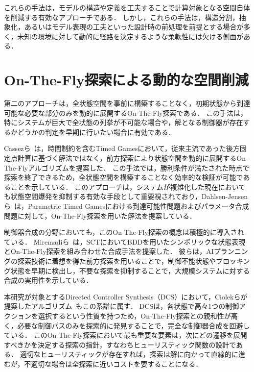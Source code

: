 \documentclass[a4paper,11pt,oneside,openany,report,dvipdfmx]{jsbook}
\begin{document}
これらの手法は，モデルの構造や定義を工夫することで計算対象となる空間自体を削減する有効なアプローチである．
しかし，これらの手法は，構造分割，抽象化，あるいはモデル表現の工夫といった設計時の前処理を前提とする場合が多く，未知の環境に対して動的に経路を決定するような柔軟性には欠ける側面がある．

\section{On-The-Fly探索による動的な空間削減}

第二のアプローチは，全状態空間を事前に構築することなく，初期状態から到達可能な必要な部分のみを動的に展開するOn-The-Fly探索である．
この手法は，特にシステムが巨大で全状態の列挙が不可能な場合や，解となる制御器が存在するかどうかの判定を早期に行いたい場合に有効である．

Cassezら~\cite{OnTheFlyForTimedGames}は，時間制約を含むTimed Gamesにおいて，従来主流であった後方固定点計算に基づく解法ではなく，前方探索により状態空間を動的に展開するOn-The-Flyアルゴリズムを提案した．
この手法では，勝利条件が満たされた時点で探索を終了できるため，全状態空間を構築することなく効率的な検証が可能であることを示している．
このアプローチは，システムが複雑化した現在においても状態空間爆発を抑制する有効な手段として重要視されており，Dahlsen-Jensenら~\cite{OnTheFlyForReachability}は，Parametric Timed Gamesにおける到達可能性問題およびパラメータ合成問題に対して，On-The-Fly探索を用いた解法を提案している．

制御器合成の分野においても，このOn-The-Fly探索の概念は積極的に導入されている．
Miremadiら~\cite{SymbolicOnTheFlySynthesis}は，SCTにおいてBDDを用いたシンボリックな状態表現とOn-The-Fly探索を組み合わせた合成手法を提案した．
彼らは，AIプランニングの探索技術に着想を得た前方探索を用いることで，制御不能状態やブロッキング状態を早期に検出し，不要な探索を抑制することで，大規模システムに対する合成の実用性を示している．

本研究が対象とするDirected Controller Synthesis（DCS）において，Ciolekらが提案したアルゴリズム~\cite{DirectedControllerSynthesis}もこの系譜に属す．
DCSは，各状態で高々1つの制御アクションを選択するという性質を持つため，On-The-Fly探索との親和性が高く，必要な制御パスのみを探索的に発見することで，完全な制御器合成を回避している．
このOn-The-Fly探索において最も重要な要素は，次にどの遷移を展開すべきかを決定する探索の指針，すなわちヒューリスティック関数の設計である．
適切なヒューリスティックが存在すれば，探索は解に向かって直線的に進むが，不適切な場合は全探索に近いコストを要することになる．
\end{document}
